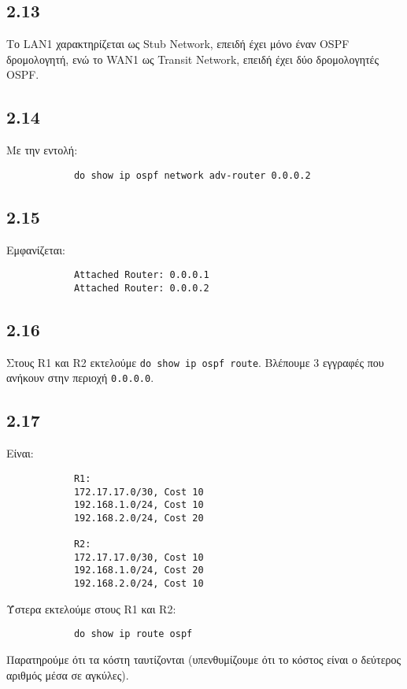 \documentclass[a4paper, 12pt]{article}
\begin{document}
	\subsection*{2.13}
		Το LAN1 χαρακτηρίζεται ως Stub Network, επειδή έχει μόνο έναν OSPF δρομολογητή, ενώ το WAN1 ως Transit Network, επειδή έχει δύο δρομολογητές OSPF.

	\subsection*{2.14}
		Με την εντολή:
		
		\begin{verbatim}
			do show ip ospf network adv-router 0.0.0.2
		\end{verbatim}

	\subsection*{2.15}
		Εμφανίζεται:
		
		\begin{verbatim}
			Attached Router: 0.0.0.1
			Attached Router: 0.0.0.2
		\end{verbatim}

	\subsection*{2.16}
		Στους R1 και R2 εκτελούμε \verb|do show ip ospf route|. Βλέπουμε 3 εγγραφές που ανήκουν στην περιοχή \verb|0.0.0.0|.

	\subsection*{2.17}
		Είναι:
		
		\begin{verbatim}
			R1:
			172.17.17.0/30, Cost 10
			192.168.1.0/24, Cost 10
			192.168.2.0/24, Cost 20
			
			R2:
			172.17.17.0/30, Cost 10
			192.168.1.0/24, Cost 20
			192.168.2.0/24, Cost 10
		\end{verbatim}
		
		Ύστερα εκτελούμε στους R1 και R2:
		
		\begin{verbatim}
			do show ip route ospf
		\end{verbatim}
		
		Παρατηρούμε ότι τα κόστη ταυτίζονται (υπενθυμίζουμε ότι το κόστος είναι ο δεύτερος αριθμός μέσα σε αγκύλες).
\end{document}
